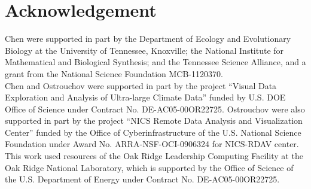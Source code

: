 
\section*{Acknowledgement}

Chen were supported in part by
the Department of Ecology and Evolutionary Biology at the
University of Tennessee, Knoxville; the National Institute for Mathematical
and Biological Synthesis; and the Tennessee Science Alliance, and a grant from
the National Science Foundation MCB-1120370.
\\

Chen and Ostrouchov were supported in part by the project
``Visual Data Exploration and Analysis of Ultra-large Climate Data''
funded by U.S. DOE Office of Science
under Contract No. DE-AC05-00OR22725.
Ostrouchov were also supported in part by the project
``NICS Remote Data Analysis and Visualization Center''
funded by the Office of Cyberinfrastructure of the
U.S. National Science Foundation
under Award No. ARRA-NSF-OCI-0906324 for NICS-RDAV center.
\\

This work used resources of the Oak Ridge Leadership Computing Facility at the
Oak Ridge National Laboratory, which is supported by the Office of Science
of the U.S. Department of Energy under Contract No. DE-AC05-00OR22725.
\\

